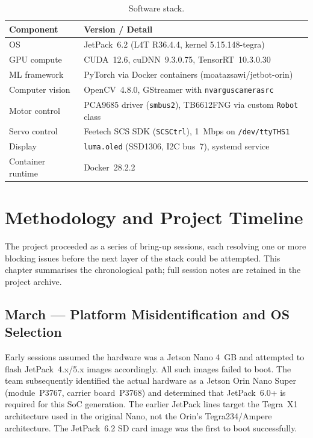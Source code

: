 \documentclass{imc-inf}
\begin{document}
\begin{table}[htbp]
\centering
\caption{Software stack.}
\label{tab:software}
\begin{tabular}{@{}ll@{}}
\toprule
\textbf{Component} & \textbf{Version / Detail} \\
\midrule
OS & JetPack~6.2 (L4T R36.4.4, kernel 5.15.148-tegra) \\
GPU compute & CUDA~12.6, cuDNN~9.3.0.75, TensorRT~10.3.0.30 \cite{nvidia_tensorrt} \\
ML framework & PyTorch via Docker containers (moatazsawi/jetbot-orin) \cite{moatazsawi_jetbot_orin} \\
Computer vision & OpenCV~4.8.0, GStreamer with \texttt{nvarguscamerasrc} \\
Motor control & PCA9685 driver (\texttt{smbus2}), TB6612FNG via custom \texttt{Robot} class \\
Servo control & Feetech SCS SDK (\texttt{SCSCtrl}), 1~Mbps on \texttt{/dev/ttyTHS1} \\
Display & \texttt{luma.oled} (SSD1306, I2C bus~7), systemd service \\
Container runtime & Docker~28.2.2 \\
\bottomrule
\end{tabular}
\end{table}

\chapter[Methodology]{Methodology and Project Timeline}
\label{chap:methodology}

The project proceeded as a series of bring-up sessions, each resolving one or more
blocking issues before the next layer of the stack could be attempted. This chapter
summarises the chronological path; full session notes are retained in the project
archive.

\section{March --- Platform Misidentification and OS Selection}
\label{sec:march}

Early sessions assumed the hardware was a Jetson Nano 4~GB and attempted to flash
JetPack~4.x/5.x images accordingly. All such images failed to boot. The team
subsequently identified the actual hardware as a Jetson Orin Nano Super
(module~P3767, carrier board~P3768) and determined that JetPack~6.0+ is required
for this SoC generation. The earlier JetPack lines target the Tegra~X1 architecture
used in the original Nano, not the Orin's Tegra234/Ampere architecture. The JetPack~6.2
SD card image was the first to boot successfully.
\end{document}
